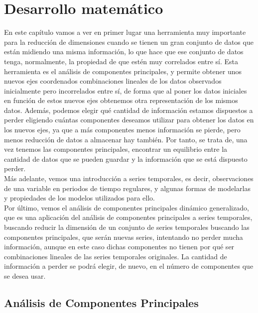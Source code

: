 %
%


\chapter{Desarrollo matemático}

En este capítulo vamos a ver en primer lugar una herramienta muy importante para la reducción de dimensiones cuando se tienen un gran conjunto de datos que están midiendo una misma información, lo que hace que ese conjunto de datos tenga, normalmente, la propiedad de que estén muy correlados entre sí. Esta herramienta es el análisis de componentes principales, y permite obtener unos nuevos ejes coordenados combinaciones lineales de los datos observados inicialmente pero incorrelados entre sí, de forma que al poner los datos iniciales en función de estos nuevos ejes obtenemos otra representación de los mismos datos. Además, podemos elegir qué cantidad de información estamos dispuestos a perder eligiendo cuántas componentes deseamos utilizar para obtener los datos en los nuevos ejes, ya que a más componentes menos información se pierde, pero menos reducción de datos a almacenar hay también. Por tanto, se trata de, una vez tenemos las componentes principales, encontrar un equilibrio entre la cantidad de datos que se pueden guardar y la información que se está dispuesto perder.\\

Más adelante, vemos una introducción a series temporales, es decir, observaciones de una variable en periodos de tiempo regulares, y algunas formas de modelarlas y propiedades de los modelos utilizados para ello.\\

Por último, vemos el análisis de componentes principales dinámico generalizado, que es una aplicación del análisis de componentes principales a series temporales, buscando reducir la dimensión de un conjunto de series temporales buscando las componentes principales, que serán nuevas series, intentando no perder mucha información, aunque en este caso dichas componentes no tienen por qué ser combinaciones lineales de las series temporales originales. La cantidad de información a perder se podrá elegir, de nuevo, en el número de componentes que se desea usar.

\section{Análisis de Componentes Principales}

